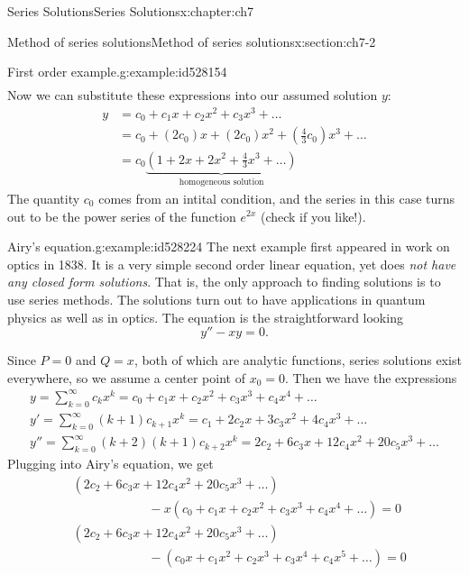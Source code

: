 \documentclass[oneside,10pt,]{book}
\numberwithin{equation}{section}
\numberwithin{equation}{section}
\newcommand{\amp}{&}
\begin{document}
\begin{chapterptx}{Series Solutions}{}{Series Solutions}{}{}{x:chapter:ch7}
\begin{sectionptx}{Method of series solutions}{}{Method of series solutions}{}{}{x:section:ch7-2}
\begin{example}{First order example.}{g:example:id528154}
\begin{equation*}
\begin{array}{ccc}
\end{array}
\end{equation*}
Now we can substitute these expressions into our assumed solution \(y\):%
\begin{align*}
y \amp = c_0 + c_1 x + c_2 x^2 + c_3 x^3 + \ldots\\
\amp = c_0 + (2c_0) x + (2c_0)x^2 + (\frac{4}{3}c_0)x^3 + \ldots\\
\amp = c_0\underbrace{\left(1 + 2x + 2x^2 + \frac{4}{3} x^3 + \ldots \right)}_{\text{homogeneous solution}}
\end{align*}
The quantity \(c_0\) comes from an intital condition, and the series in this case turns out to be the power series of the function \(e^{2x}\) (check if you like!).%
\end{example}
\begin{example}{Airy's equation.}{g:example:id528224}%
The next example first appeared in work on optics in 1838. It is a very simple second order linear equation, yet does \emph{not have any closed form solutions}. That is, the only approach to finding solutions is to use series methods. The solutions turn out to have applications in quantum physics as well as in optics. The equation is the straightforward looking%
\begin{equation*}
y'' - x y = 0.
\end{equation*}
%
\par
Since \(P = 0\) and \(Q = x\), both of which are analytic functions, series solutions exist everywhere, so we assume a center point of \(x_0 = 0\). Then we have the expressions%
\begin{gather*}
y = \sum_{k=0}^\infty c_k x^k = c_0 + c_1 x + c_2 x^2 + c_3 x^3 + c_4 x^4 + \ldots\\
y' = \sum_{k=0}^\infty (k+1) c_{k+1} x^k = c_1 + 2c_2 x + 3 c_3 x^2 + 4 c_4 x^3 + \ldots\\
y'' = \sum_{k=0}^\infty (k+2)(k+1) c_{k+2} x^k = 2c_2 + 6c_3 x + 12 c_4 x^2 + 20c_5 x^3 + \ldots
\end{gather*}
Plugging into Airy's equation, we get%
\begin{align*}
\amp(2c_2 + 6c_3 x + 12 c_4 x^2 + 20c_5 x^3 + \ldots)\\
\amp\hspace{1in} - x(c_0 + c_1 x + c_2 x^2 + c_3 x^3 + c_4 x^4 + \ldots) = 0\\
\amp(2c_2 + 6c_3 x + 12 c_4 x^2 + 20c_5 x^3 + \ldots)\\
\amp\hspace{1in} - (c_0 x + c_1 x^2 + c_2 x^3 + c_3 x^4 + c_4 x^5 + \ldots) = 0\\

\end{align*}
\end{example}
\end{sectionptx}
\end{chapterptx}
\end{document}
